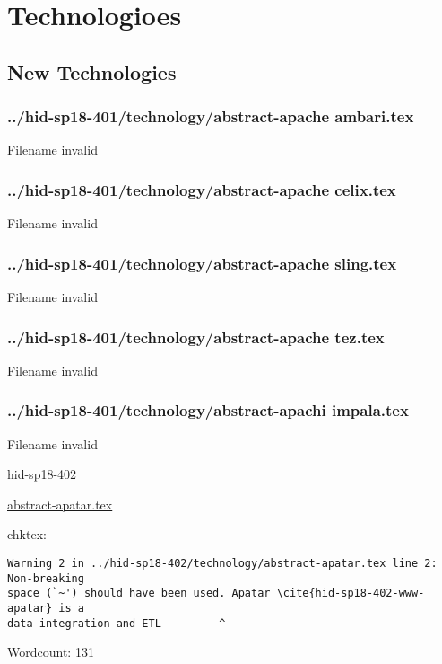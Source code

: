 \part{Technologioes}
\chapter{New Technologies}
\section{../hid-sp18-401/technology/abstract-apache ambari.tex}
Filename invalid
\section{../hid-sp18-401/technology/abstract-apache celix.tex}
Filename invalid
\section{../hid-sp18-401/technology/abstract-apache sling.tex}
Filename invalid
\section{../hid-sp18-401/technology/abstract-apache tez.tex}
Filename invalid
\section{../hid-sp18-401/technology/abstract-apachi impala.tex}
Filename invalid


\begin{IU}

hid-sp18-402

\href{https://github.com/cloudmesh-community/hid-sp18-402/blob/master//technology/abstract-apatar.tex}{abstract-apatar.tex}

 
chktex:
\begin{tiny}
\begin{verbatim}
Warning 2 in ../hid-sp18-402/technology/abstract-apatar.tex line 2: Non-breaking
space (`~') should have been used. Apatar \cite{hid-sp18-402-www-apatar} is a
data integration and ETL         ^
\end{verbatim}
\end{tiny}

Wordcount: 131

\end{IU}



